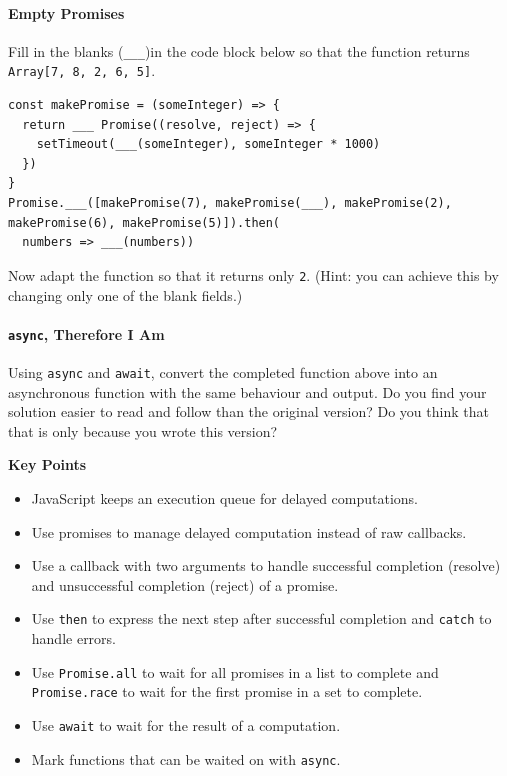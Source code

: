 \paragraph{Empty Promises}\label{empty-promises}

Fill in the blanks (\texttt{\_\_\_})in the code block below so that the
function returns \texttt{Array{[}7,\ 8,\ 2,\ 6,\ 5{]}}.

\begin{verbatim}
const makePromise = (someInteger) => {
  return ___ Promise((resolve, reject) => {
    setTimeout(___(someInteger), someInteger * 1000)
  })
}
Promise.___([makePromise(7), makePromise(___), makePromise(2), makePromise(6), makePromise(5)]).then(
  numbers => ___(numbers))
\end{verbatim}

Now adapt the function so that it returns only \texttt{2}. (Hint: you
can achieve this by changing only one of the blank fields.)

\paragraph{\texorpdfstring{\texttt{async}, Therefore I
Am}{async, Therefore I Am}}\label{async-therefore-i-am}

Using \texttt{async} and \texttt{await}, convert the completed function
above into an asynchronous function with the same behaviour and output.
Do you find your solution easier to read and follow than the original
version? Do you think that that is only because you wrote this version?

\textbf{Key Points}

\begin{itemize}
\tightlist
\item
  JavaScript keeps an execution queue for delayed computations.
\item
  Use promises to manage delayed computation instead of raw callbacks.
\item
  Use a callback with two arguments to handle successful completion
  (resolve) and unsuccessful completion (reject) of a promise.
\item
  Use \texttt{then} to express the next step after successful completion
  and \texttt{catch} to handle errors.
\item
  Use \texttt{Promise.all} to wait for all promises in a list to
  complete and \texttt{Promise.race} to wait for the first promise in a
  set to complete.
\item
  Use \texttt{await} to wait for the result of a computation.
\item
  Mark functions that can be waited on with \texttt{async}.
\end{itemize}

